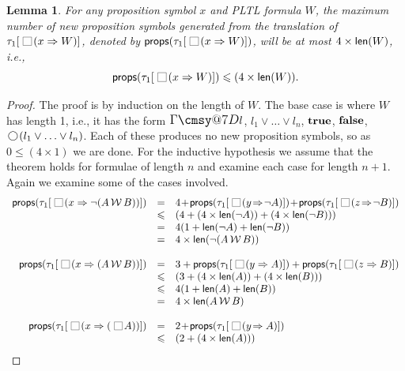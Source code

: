 \documentclass[nohyperref]{acmtrans2f}
\makeatletter
\def\sometime{\mathord{\hbox{\large$\mathchar"0\cmsy@7D$}}}
\newcommand{\always}{\raisebox{-.2ex}{
                           \mbox{\unitlength=0.9ex
                           \begin{picture}(2,2)
                           \linethickness{0.06ex}
                           \put(0,0){\line(1,0){2}}
                           \put(0,2){\line(1,0){2}}
                           \put(0,0){\line(0,1){2}}
                           \put(2,0){\line(0,1){2}}
                           \end{picture}}}
                          \,}
\newcommand{\next}{\!\raisebox{-.2ex}{ %
                        \mbox{\unitlength=0.9ex
                        \begin{picture}(2,2)
                        \linethickness{0.06ex}
                        \put(1,1){\circle{2}} %
                        \end{picture}}}       %
                        \,}
\def\unless{\hbox{$\,\cal W \,$}}
\let\imp=\Rightarrow
\let\iff=\Leftrightarrow
\def\ltrue{\hbox{\rm\bf true}}
\def\lfalse{\hbox{\rm\bf false}}
\newtheorem{sublemma}{Lemma}[subsection]
\newcommand{\len}{{\sf len}}
\newcommand{\props}{{\sf props}}
\makeatother
\begin{document}
\begin{sublemma}\label{no.of.props}
For any proposition symbol $x$ and PLTL formula $W$, 
the maximum number of new proposition symbols generated from the
translation of $\tau_1[\always(x \imp W)]$, denoted by
$\props(\tau_1[\always(x \imp W)])$, will be at most $4 \times
\len(W)$, i.e.,
$$
\props(\tau_1[\always(x \imp W)]) \leqslant (4 \times \len(W)).
$$
\end{sublemma}
\begin{proof}
The proof is by induction on the length of $W$. The base case is where
$W$ has length 1, i.e., it has the form $\sometime l$, $l_1 \lor
\ldots \lor l_n$, $\ltrue$, $\lfalse$, $\next(l_1 \lor \ldots \lor
l_n)$. Each of these produces no new proposition symbols, so as $0 \leqslant
(4 \times 1)$ we are done. For the inductive hypothesis we assume that
the theorem holds for formulae of length $n$ and examine each case for
length $n+1$. Again we examine some of the cases involved.
$$
\begin{array}{rcl}
\props(\tau_1[\always(x \imp \neg (A \unless B))]) & = & 4\! +\!
\props(\tau_1[ \always(y\! \imp\! \neg A)])\! +\!
\props(\tau_1[\always(z\! \imp\! \neg B)])\\ 
     & \leqslant &     (4  + (4 \times \len(\neg A)) + (4 \times \len(\neg B))) \\
      & = &     4 (1 + \len(\neg A) + \len(\neg B)) \\
      & = &      4 \times \len(\neg (A \unless B))\\
\\
\props(\tau_1[\always(x \imp (A \unless B))]) & = & 3 + \props(\tau_1[\always(y \imp A)]) +
\props(\tau_1[\always(z \imp B)])\\
     & \leqslant &     (3  + (4 \times \len(A)) + (4 \times \len(B))) \\
      & \leqslant &     4 (1 + \len(A) + \len(B)) \\
      & = &      4 \times \len(A \unless B)\\
\\
\props(\tau_1[ \always(x \imp (\always A))]) & = & 2\! +\!
\props(\tau_1[\always(y\! \imp A)]) \\ 
     & \leqslant &     (2  + (4 \times \len(A)) ) \\

\end{array}$$
\end{proof}
\end{document}
